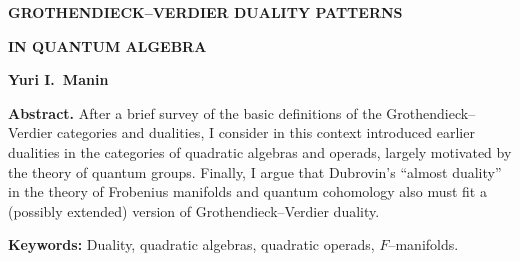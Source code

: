

\document
{}
\NoBlackBoxes
\nologo
{}
\pageheight {16cm}
\def\A{\Cal{A}}
\def\C{\Cal{C}}
\def\D{\Cal{D}}
\def\F{\bold{F}}
\def\U{\Cal{U}}
\def\N{\Cal{N}}
\def\M{\Cal{M}}
\def\Q{\Cal{Q}}
\def\O{\Cal{O}}
\def\r{\roman}

\bigskip

\centerline{\bf GROTHENDIECK--VERDIER DUALITY PATTERNS}


\medskip

\centerline{\bf IN QUANTUM ALGEBRA}

\bigskip

\centerline{\bf Yuri I.~Manin}



\bigskip

{\bf Abstract.} After a brief survey of the basic definitions of the Grothendieck--Verdier
categories and dualities,  I consider in this context introduced earlier dualities in the categories
of quadratic algebras and operads, largely motivated by the theory of quantum groups.
Finally, I argue that Dubrovin's ``almost duality'' in the theory of Frobenius
manifolds and quantum cohomology also must fit a (possibly extended)
version of Grothendieck--Verdier duality.                            


\bigskip

{\bf Keywords: } Duality, quadratic algebras, quadratic operads, $F$--manifolds.

